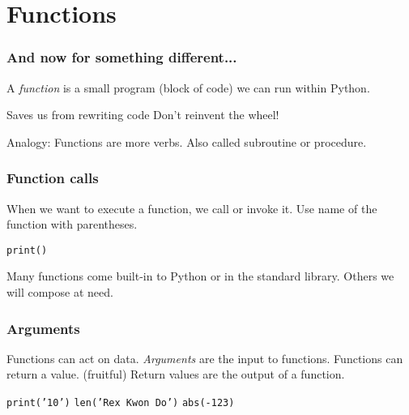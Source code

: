 \documentclass[11pt]{beamer}
\begin{document}
\section{Functions}

\begin{frame}
  \frametitle{And now for something different...}
  \Enlarge

  \begin{itemize}
  \myitem  A \emph{function} is a small program (block of code) we can run within Python. \pause
    \begin{itemize}
    \mysubitem  Saves us from rewriting code
    \mysubitem  Don't reinvent the wheel!
    \end{itemize} \pause
  \myitem  Analogy:  Functions are more verbs. \pause
  \myitem  Also called subroutine or procedure.
  \end{itemize}
\end{frame}

\begin{frame}
  \frametitle{Function calls}
  \Enlarge

  \begin{itemize}
  \myitem  When we want to execute a function, we call or invoke it. \pause
  \myitem  Use name of the function with parentheses. \pause
    \begin{itemize}
    \mysubitem  \texttt{print()}
    \end{itemize} \pause
  \myitem  Many functions come built-in to Python or in the standard library. \pause
  \myitem  Others we will compose at need.
  \end{itemize}
\end{frame}

\begin{frame}
  \frametitle{Arguments}
  \Enlarge

  \begin{itemize}
  \myitem  Functions can act on data. \pause
  \myitem  \emph{Arguments} are the input to functions. \pause
  \myitem  Functions can return a value.  (fruitful) \pause
  \myitem  Return values are the output of a function. \pause
    \begin{itemize}
    \mysubitem  \texttt{print('10')}
    \mysubitem  \texttt{len('Rex Kwon Do')}
    \mysubitem  \texttt{abs(-123)}
    \end{itemize}
  \end{itemize}
\end{frame}
\end{document}

